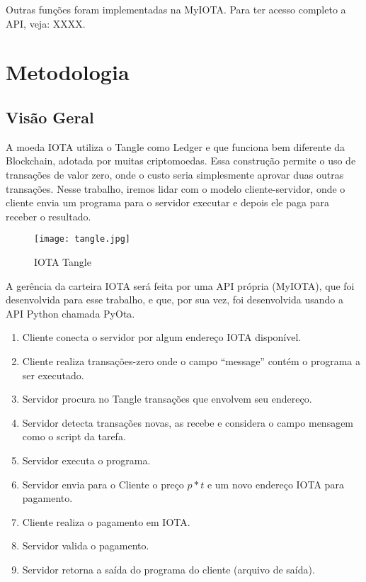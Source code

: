 \documentclass[a4paper]{article}
\begin{document}
Outras funções foram implementadas na MyIOTA. Para ter acesso completo a API, veja: XXXX.

\section{Metodologia}\label{sec:Metodology}

\subsection{Visão Geral}

A moeda IOTA utiliza o Tangle como Ledger e que funciona bem diferente da Blockchain, adotada por muitas criptomoedas. Essa construção
permite o uso de transações de valor zero, onde o custo seria simplesmente aprovar duas outras transações. Nesse trabalho, iremos
lidar com o modelo cliente-servidor, onde o cliente envia um programa para o servidor executar e depois ele paga para receber
o resultado.

\begin{figure}[!htb]
\centering
\texttt{[image: tangle.jpg]}
\caption{IOTA Tangle}
\label{fig:tangle}
\end{figure}

A gerência da carteira IOTA será feita por uma API própria (MyIOTA), que foi desenvolvida para esse trabalho, e que, por sua vez, foi
desenvolvida usando a API Python chamada PyOta.

\begin{enumerate}
\item Cliente conecta o servidor por algum endereço IOTA disponível.
\item Cliente realiza transações-zero onde o campo ``message'' contém o programa a ser executado.
\item Servidor procura no Tangle transações que envolvem seu endereço.
\item Servidor detecta transações novas, as recebe e considera o campo mensagem como o script da tarefa.
\item Servidor executa o programa.
\item Servidor envia para o Cliente o preço $p*t$ e um novo endereço IOTA para pagamento.
\item Cliente realiza o pagamento em IOTA.
\item Servidor valida o pagamento.
\item Servidor retorna a saída do programa do cliente (arquivo de saída).
\end{enumerate}
\end{document}
